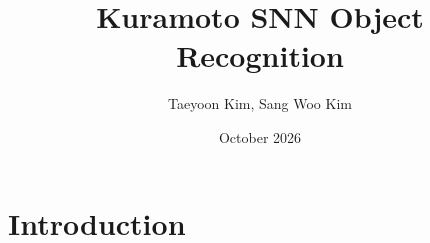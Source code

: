 \documentclass[letterpaper,twocolumn]{article}
\title{Kuramoto SNN Object Recognition}
\author{Taeyoon Kim, Sang Woo Kim}
\date{October 2026}
\begin{document}
\maketitle

\section{Introduction}


\end{document}
